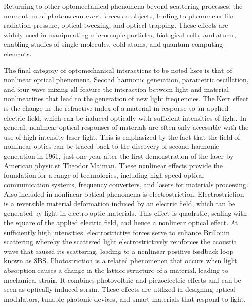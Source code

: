 Returning to other optomechanical phenomena beyond scattering processes, the momentum of photons can exert forces on objects, leading to phenomena like radiation pressure, optical tweezing, and optical trapping. These effects are widely used in manipulating microscopic particles, biological cells, and atoms, enabling studies of single molecules, cold atoms, and quantum computing elements. \cite{ashkin1987optical, raab1987trapping, browaeys2020many}

The final category of optomechanical interactions to be noted here is that of nonlinear optical phenomena. Second harmonic generation, parametric oscillation, and four-wave mixing all feature the interaction between light and material nonlinearities that lead to the generation of new light frequencies.\cite{boyd2020nonlinear} The Kerr effect is the change in the refractive index of a material in response to an applied electric field, which can be induced optically with sufficient intensities of light. In general, nonlinear optical responses of materials are often only accessible with the use of high intensity laser light. This is emphasized by the fact that the field of nonlinear optics can be traced back to the discovery of second-harmonic generation in 1961\cite{franken1961generation}, just one year after the first demonstration of the laser by American physicist Theodor Maiman.\cite{maiman1960stimulated} These nonlinear effects provide the foundation for a range of technologies, including high-speed optical communication systems, frequency converters, and lasers for materials processing. \cite{franken1961generation, mollenauer1980experimental, strickland1985compression} Also included in nonlinear optical phenomena is electrostriction. Electrostriction is a reversible material deformation induced by an electric field, which can be generated by light in electro-optic materials. This effect is quadratic, scaling with the square of the applied electric field, and hence a nonlinear optical effect. At sufficiently high intensities, electrostrictive forces serve to enhance Brillouin scattering whereby the scattered light electrostrictively reinforces the acoustic wave that caused its scattering, leading to a nonlinear positive feedback loop known as \ac{SBS}. Photostriction is a related phenomenon that occurs when light absorption causes a change in the lattice structure of a material, leading to mechanical strain. It combines photovoltaic and piezoelectric effects and can be seen as optically induced strain. These effects are utilized in designing optical modulators, tunable photonic devices, and smart materials that respond to light. \cite{haertling1971hot, chu1995photostrictive}



